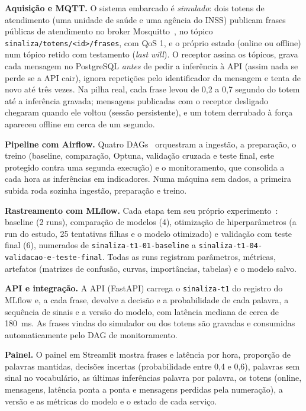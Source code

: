 \documentclass[12pt]{article}
\begin{document}
\textbf{Aquisição e MQTT.} O sistema embarcado é \emph{simulado}: dois totens de atendimento (uma
unidade de saúde e uma agência do INSS) publicam frases públicas de atendimento no broker
Mosquitto~\cite{light:17}, no tópico \texttt{sinaliza/totens/<id>/frases}, com QoS 1, e o próprio estado
(online ou offline) num tópico retido com testamento (\emph{last will}). O receptor assina os tópicos,
grava cada mensagem no PostgreSQL \emph{antes} de pedir a inferência à API (assim nada se perde se a API
cair), ignora repetições pelo identificador da mensagem e tenta de novo até três vezes. Na pilha real,
cada frase levou de 0,2 a 0,7 segundo do totem até a inferência gravada; mensagens publicadas com o
receptor desligado chegaram quando ele voltou (sessão persistente), e um totem derrubado à força
apareceu offline em cerca de um segundo.

\textbf{Pipeline com Airflow.} Quatro DAGs~\cite{airflow:26} orquestram a ingestão, a preparação, o
treino (baseline, comparação, Optuna, validação cruzada e teste final, este protegido contra uma
segunda execução) e o monitoramento, que consolida a cada hora as inferências em indicadores. Numa
máquina sem dados, a primeira subida roda sozinha ingestão, preparação e treino.

\textbf{Rastreamento com MLflow.} Cada etapa tem seu próprio experimento~\cite{zaharia:18}: baseline
(2 runs), comparação de modelos (4), otimização de hiperparâmetros (a run do estudo, 25 tentativas filhas
e o modelo otimizado) e validação com teste final (6), numerados de \texttt{sinaliza-t1-01-baseline} a
\texttt{sinaliza-t1-04-validacao-e-teste-final}. Todas as runs registram parâmetros, métricas, artefatos
(matrizes de confusão, curvas, importâncias, tabelas) e o modelo salvo.

\textbf{API e integração.} A API (FastAPI) carrega o \texttt{sinaliza-t1} do registro do MLflow e, a
cada frase, devolve a decisão e a probabilidade de cada palavra, a sequência de sinais e a versão do
modelo, com latência mediana de cerca de 180~ms. As frases vindas do simulador ou dos totens são
gravadas e consumidas automaticamente pelo DAG de monitoramento.

\textbf{Painel.} O painel em Streamlit mostra frases e latência por hora, proporção de palavras
mantidas, decisões incertas (probabilidade entre 0,4 e 0,6), palavras sem sinal no vocabulário, as
últimas inferências palavra por palavra, os totens (online, mensagens, latência ponta a ponta e
mensagens perdidas pela numeração), a versão e as métricas do modelo e o estado de cada serviço.
\end{document}

